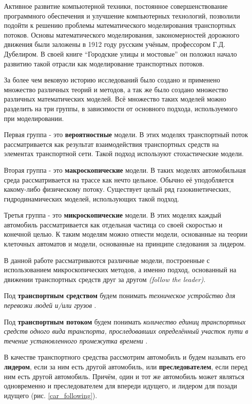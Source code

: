 \documentclass[12pt, a4paper]{extarticle}
\numberwithin{equation}{section}
\numberwithin{figure}{section}
\begin{document}
Активное развитие компьютерной техники, постоянное совершенствование программного обеспечения и улучшение компьютерных технологий, позволили подойти к решению проблемы математического моделирования транспортных потоков. Основы математического моделирования, закономерностей дорожного движения были заложены в 1912 году русским учёным, профессором Г.Д. Дубелиром. В своей книге ``Городские улицы и мостовые'' \cite{Street} он положил начало развитию такой отрасли как моделирование транспортных потоков.

За более чем вековую историю исследований было создано и применено множество различных теорий и методов, а так же было создано множество различных математических моделей. Всё множество таких моделей можно разделить на три группы, в зависимости от основного подхода, используемого при моделировании.

Первая группа - это \textbf{вероятностные} модели. В этих моделях транспортный поток рассматривается как результат взаимодействия транспортных средств на элементах транспортной сети.
Такой подход используют стохастические модели.

Вторая группа - это \textbf{макроскопические} модели. В таких моделях автомобильная среда рассматривается на трассе как нечто цельное. Обычно её уподобляется какому-либо физическому потоку. Существует целый ряд газокинетических, гидродинамических моделей, использующих такой подход.

Третья группа - это \textbf{микроскопические} модели. В этих моделях каждый автомобиль рассматривается как отдельная частица со своей скоростью и конечной целью. К таким моделям можно отнести модели, основанные на теории клеточных автоматов и модели, основанные на принципе следования за лидером.

В данной работе рассматриваются различные модели, построенные с использованием микроскопических методов, а именно подход, основанный на движении транспортных средств друг за другом {\it(follow the leader)}.

Под \textbf{транспортным средством} будем понимать {\it техническое устройство для перевозки людей и/или грузов} \cite{TrafficFlow}.

Под \textbf{транспортным потоком} будем понимать {\it количество единиц транспортных средств одного вида транспорта, проследовавших определённый участок пути в течение установленного промежутка времени} \cite{TrafficFlow}.

В качестве транспортного средства рассмотрим автомобиль и будем называть его \textbf{лидером}, если за ним есть другой автомобиль, или \textbf{преследователем}, если перед ним есть другой автомобиль. Причём, один и тот же автомобиль может являться одновременно и преследователем для впереди идущего, и лидером для позади идущего (рис. \ref{car_following}). 
\end{document}
